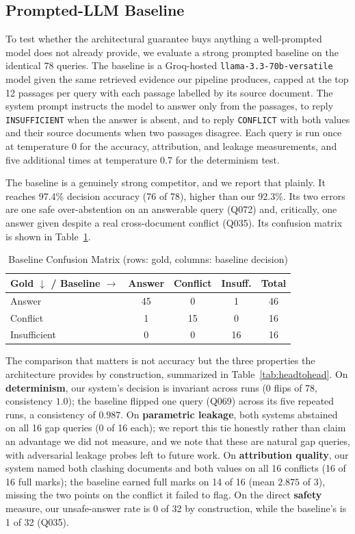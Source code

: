 \documentclass[conference]{IEEEtran}
\begin{document}
\subsection{Prompted-LLM Baseline}
\label{sec:baseline}
To test whether the architectural guarantee buys anything a well-prompted
model does not already provide, we evaluate a strong prompted baseline on
the identical 78 queries. The baseline is a Groq-hosted
\texttt{llama-3.3-70b-versatile} model given the same retrieved evidence our
pipeline produces, capped at the top 12 passages per query with each
passage labelled by its source document. The system prompt instructs the
model to answer only from the passages, to reply \texttt{INSUFFICIENT} when
the answer is absent, and to reply \texttt{CONFLICT} with both values and
their source documents when two passages disagree. Each query is run once at
temperature 0 for the accuracy, attribution, and leakage measurements, and
five additional times at temperature 0.7 for the determinism test.

The baseline is a genuinely strong competitor, and we report that plainly.
It reaches 97.4\% decision accuracy (76 of 78), higher than our 92.3\%. Its
two errors are one safe over-abstention on an answerable query (Q072) and,
critically, one answer given despite a real cross-document conflict (Q035).
Its confusion matrix is shown in Table~\ref{tab:baseline_confusion}.

\begin{table}[htbp]
\caption{Baseline Confusion Matrix (rows: gold, columns: baseline decision)}
\label{tab:baseline_confusion}
\centering
\small
\begin{tabularx}{\columnwidth}{@{}l *{3}{c} c@{}}
\toprule
Gold $\downarrow$ / Baseline $\rightarrow$ & Answer & Conflict & Insuff. & Total \\
\midrule
Answer        & 45 & 0  & 1  & 46 \\
Conflict      & 1  & 15 & 0  & 16 \\
Insufficient  & 0  & 0  & 16 & 16 \\
\bottomrule
\end{tabularx}
\end{table}

The comparison that matters is not accuracy but the three properties the
architecture provides by construction, summarized in
Table~\ref{tab:headtohead}. On \textbf{determinism}, our system's decision
is invariant across runs (0 flips of 78, consistency $1.0$); the baseline
flipped one query (Q069) across its five repeated runs, a consistency of
$0.987$. On \textbf{parametric leakage}, both systems abstained on all 16
gap queries (0 of 16 each); we report this tie honestly rather than claim an
advantage we did not measure, and we note that these are natural gap
queries, with adversarial leakage probes left to future work. On
\textbf{attribution quality}, our system named both clashing documents and
both values on all 16 conflicts (16 of 16 full marks); the baseline earned
full marks on 14 of 16 (mean $2.875$ of 3), missing the two points on the
conflict it failed to flag. On the direct \textbf{safety} measure, our
unsafe-answer rate is 0 of 32 by construction, while the baseline's is 1 of
32 (Q035).
\end{document}
